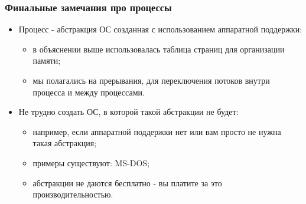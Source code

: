 \begin{frame}
\frametitle{Финальные замечания про процессы}
\begin{itemize}
  \item Процесс - абстракция ОС созданная с использованием аппаратной поддержки:
  \begin{itemize}
    \item в объяснении выше использовалась таблица страниц для организации
    памяти;
    \item мы полагались на прерывания, для переключения потоков внутри процесса
    и между процессами.
  \end{itemize}
  \item Не трудно создать ОС, в которой такой абстракции не будет:
  \begin{itemize}
    \item например, если аппаратной поддержки нет или вам просто не нужна такая
    абстракция;
    \item примеры существуют: MS-DOS;
    \item абстракции не даются бесплатно - вы платите за это
    производительностью.
  \end{itemize}
\end{itemize}
\end{frame}
